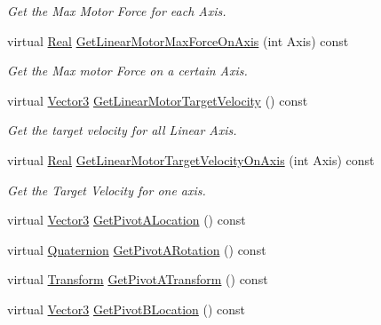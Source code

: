 \begin{DoxyCompactItemize}
\begin{DoxyCompactList}\small\item\em Get the Max Motor Force for each Axis. \item\end{DoxyCompactList}\item 
virtual \hyperlink{namespaceMezzanine_a726731b1a7df72bf3583e4a97282c6f6}{Real} \hyperlink{classMezzanine_1_1Generic6DofConstraint_a1d47c2671f8e8a918cffe568beca0af4}{GetLinearMotorMaxForceOnAxis} (int Axis) const 
\begin{DoxyCompactList}\small\item\em Get the Max motor Force on a certain Axis. \item\end{DoxyCompactList}\item 
virtual \hyperlink{classMezzanine_1_1Vector3}{Vector3} \hyperlink{classMezzanine_1_1Generic6DofConstraint_addd83b732df3f6fe730bf51b2153585e}{GetLinearMotorTargetVelocity} () const 
\begin{DoxyCompactList}\small\item\em Get the target velocity for all Linear Axis. \item\end{DoxyCompactList}\item 
virtual \hyperlink{namespaceMezzanine_a726731b1a7df72bf3583e4a97282c6f6}{Real} \hyperlink{classMezzanine_1_1Generic6DofConstraint_a3ad266a779d330634d524615c8a027dc}{GetLinearMotorTargetVelocityOnAxis} (int Axis) const 
\begin{DoxyCompactList}\small\item\em Get the Target Velocity for one axis. \item\end{DoxyCompactList}\item 
virtual \hyperlink{classMezzanine_1_1Vector3}{Vector3} \hyperlink{classMezzanine_1_1Generic6DofConstraint_a180f26186e0ddd58c9c0746897155eaf}{GetPivotALocation} () const 
\item 
virtual \hyperlink{classMezzanine_1_1Quaternion}{Quaternion} \hyperlink{classMezzanine_1_1Generic6DofConstraint_a517388fdf36423ed0550ec19089955b9}{GetPivotARotation} () const 
\item 
virtual \hyperlink{classMezzanine_1_1Transform}{Transform} \hyperlink{classMezzanine_1_1Generic6DofConstraint_adac17da02ce3ecacf583515a66576533}{GetPivotATransform} () const 
\item 
virtual \hyperlink{classMezzanine_1_1Vector3}{Vector3} \hyperlink{classMezzanine_1_1Generic6DofConstraint_a2b7344ab150f2f6dd898b6cbcd150d6e}{GetPivotBLocation} () const 

\end{DoxyCompactItemize}
